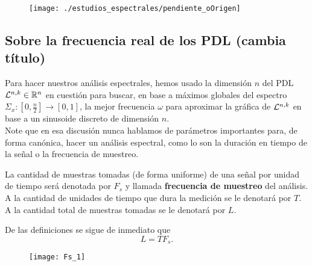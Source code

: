 \begin{figure}[H]
	\centering
	\texttt{[image: ./estudios\_espectrales/pendiente\_oOrigen]} 
\end{figure}	



\subsection{Sobre la frecuencia real de los PDL (cambia título)}

Para hacer nuestros análisis espectrales, hemos
usado la dimensión $n$ del PDL $\mathcal{L}^{n, k} \in \mathbb{R}^{n}$
en cuestión
para buscar, en base a máximos globales
del espectro 
$\Sigma_{x}: [0, \frac{n}{2}] \longrightarrow [0,1]$, la
mejor frecuencia $\omega$ para aproximar la gráfica
de $\mathcal{L}^{n,k}$ en base a un sinusoide discreto
de dimensión $n$. \\


Note que en esa discusión nunca hablamos de 
parámetros importantes para, de forma canónica, hacer
un análisis espectral, como lo son la
duración en tiempo de la señal o la frecuencia
de muestreo.

\begin{defi}
\label{def: tiempo y frec de muestreo}
La cantidad de muestras tomadas (de forma uniforme)
de una señal por unidad de tiempo 
será denotada por $F_{s}$ y llamada \textbf{frecuencia
de muestreo} del análisis. A la cantidad de unidades de
tiempo que dura la medición se le denotará por $T$. \\

A la cantidad total de muestras tomadas se le denotará
por $L$.
\end{defi}

De las definiciones se sigue de inmediato que
\begin{equation}
\label{eq: relacion L, T Fs}
L = T F_{s}.
\end{equation}
\begin{figure}[H]
	\centering
	\texttt{[image: Fs\_1]} 
\end{figure}	

